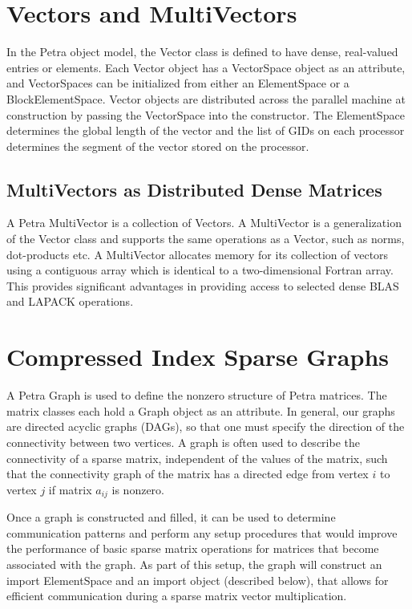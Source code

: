 \documentclass[10pt,relax]{PetraObjectModel}
\begin{document}
\section{Vectors and MultiVectors}
In the Petra object model, the Vector class is defined to have dense,
real-valued entries or elements. Each Vector object has a VectorSpace object
as an attribute, and VectorSpaces can be initialized from either an
ElementSpace or a BlockElementSpace.  Vector objects are distributed across the
parallel machine at construction by passing the VectorSpace into the
 constructor.
The ElementSpace determines the global length of the vector
and the list of GIDs on each processor
determines the segment of the vector stored on the processor.

\subsection{MultiVectors as Distributed Dense Matrices}
A Petra MultiVector is a collection of Vectors. A MultiVector is a
generalization of the Vector class and supports the
same operations as a Vector, such as norms, dot-products etc. A MultiVector
allocates memory for its collection of vectors using a contiguous array which
is identical to a two-dimensional Fortran array. This provides significant
advantages in providing access to selected dense BLAS and LAPACK operations.

\section{Compressed Index Sparse Graphs}
A Petra Graph is used to define the nonzero structure of Petra matrices. The
matrix classes each hold a Graph object as an attribute.
In general, our graphs are directed acyclic graphs (DAGs), so that one must
specify the direction of the connectivity between two vertices.  A graph is
often used to describe the connectivity of a sparse matrix, independent of
the values of the matrix, such that the connectivity graph of the matrix has
a directed edge from vertex $i$ to vertex $j$ if matrix $a_{ij}$ is nonzero.

Once a graph is constructed and filled, it can be used to determine
communication patterns and perform any setup procedures that would improve
the performance of basic sparse matrix operations for matrices that become
associated with the graph.  As part of this setup, the graph will construct
an import ElementSpace and an import object (described below), that allows for
efficient communication during a sparse matrix vector multiplication.
\end{document}
